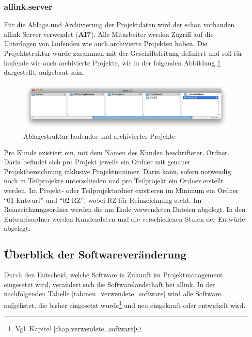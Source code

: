 \subsubsection{allink.server}
Für die Ablage und Archivierung der Projektdaten wird der schon vorhanden
allink Server verwendet (\textbf{AI7}). Alle Mitarbeiter werden Zugriff auf die Unterlagen
von laufenden wie auch archivierte Projekten haben. Die Projektstruktur
wurde zusammen mit der Geschäftsleitung definiert und soll für laufende
wie auch archivierte Projekte, wie in der folgenden Abbildung \ref{pic:05_ablagestruktur} 
dargestellt, aufgebaut sein.

\begin{figure}[htbp]
\begin{center}
\includegraphics[width=1.0\textwidth,angle=0]{./bilder/loesung/05_ablagestruktur.png}
\caption[Ablagestruktur laufender und archivierter Projekte]{Ablagestruktur 
    laufender und archivierter Projekte\footnotemark}
\label{pic:05_ablagestruktur}
\end{center}
\end{figure}

Pro Kunde existiert ein, mit dem Namen des Kunden beschrifteter, Ordner. Darin befindet
sich pro Projekt jeweils ein Ordner mit genauer Projektbezeichnung inklusive Projektnummer.
Darin kann, sofern notwendig, noch in Teilprojekte unterschieden und
pro Teilprojekt ein Ordner erstellt werden. Im Projekt- oder Teilprojektordner
existieren im Minimum ein Ordner ``01 Entwurf'' und ``02 RZ'', wobei RZ für Reinzeichnung
steht. Im Reinzeichnungsordner werden die am Ende verwendeten Dateien abgelegt.
In den Entwurfsordner werden Kundendaten und die verschiedenen Stufen der Entwürfe
abgelegt.

\subsection{Überblick der Softwareveränderung}
Durch den Entscheid, welche Software in Zukunft im Projektmanagement eingesetzt
wird, verändert sich die Softwarelandschaft bei allink. In der nachfolgenden
Tabelle \ref{tab:neu_verwendete_software} wird alle Software aufgelistet, die 
bisher eingesetzt wurde\footnote{Vgl. Kapitel \ref{chap:verwendete_software}} 
und neu eingekauft oder entwickelt wird.

